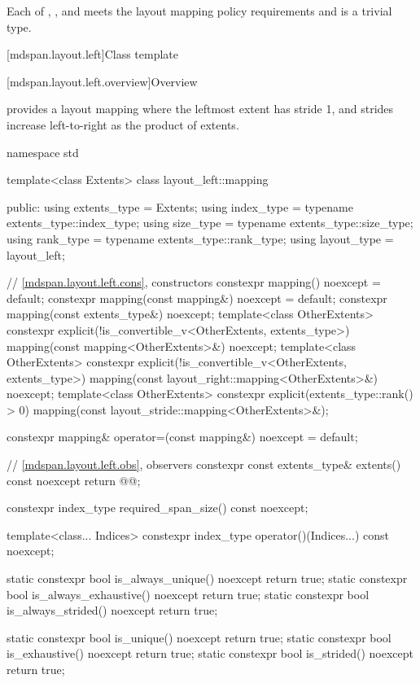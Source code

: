 \pnum
Each of , , and 
meets the layout mapping policy requirements and is a trivial type.

[mdspan.layout.left]{Class template }

[mdspan.layout.left.overview]{Overview}

\pnum
{} provides a layout mapping
where the leftmost extent has stride 1, and
strides increase left-to-right as the product of extents.

\begin{codeblock}
namespace std {
  template<class Extents>
  class layout_left::mapping {
  public:
    using extents_type = Extents;
    using index_type = typename extents_type::index_type;
    using size_type = typename extents_type::size_type;
    using rank_type = typename extents_type::rank_type;
    using layout_type = layout_left;

    // \ref{mdspan.layout.left.cons}, constructors
    constexpr mapping() noexcept = default;
    constexpr mapping(const mapping&) noexcept = default;
    constexpr mapping(const extents_type&) noexcept;
    template<class OtherExtents>
      constexpr explicit(!is_convertible_v<OtherExtents, extents_type>)
        mapping(const mapping<OtherExtents>&) noexcept;
    template<class OtherExtents>
      constexpr explicit(!is_convertible_v<OtherExtents, extents_type>)
        mapping(const layout_right::mapping<OtherExtents>&) noexcept;
    template<class OtherExtents>
      constexpr explicit(extents_type::rank() > 0)
        mapping(const layout_stride::mapping<OtherExtents>&);

    constexpr mapping& operator=(const mapping&) noexcept = default;

    // \ref{mdspan.layout.left.obs}, observers
    constexpr const extents_type& extents() const noexcept { return @@; }

    constexpr index_type required_span_size() const noexcept;

    template<class... Indices>
      constexpr index_type operator()(Indices...) const noexcept;

    static constexpr bool is_always_unique() noexcept { return true; }
    static constexpr bool is_always_exhaustive() noexcept { return true; }
    static constexpr bool is_always_strided() noexcept { return true; }

    static constexpr bool is_unique() noexcept { return true; }
    static constexpr bool is_exhaustive() noexcept { return true; }
    static constexpr bool is_strided() noexcept { return true; }

}}
\end{codeblock}
